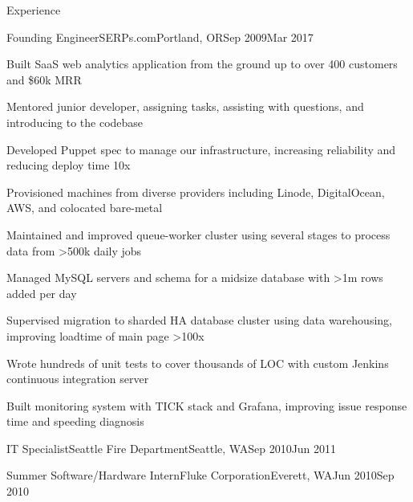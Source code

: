 \documentclass[letterpaper,12pt]{article}
\begin{document}
\begin{paracol}{2}
\begin{rsection}{Experience}
\begin{rexperienceitem}{Founding Engineer}{SERPs.com}{Portland, OR}{Sep 2009}{Mar 2017}
  \item Built SaaS web analytics application from the ground up to over 400 customers and \$60k MRR
  \item Mentored junior developer, assigning tasks, assisting with questions, and introducing to the codebase
  \item Developed Puppet spec to manage our infrastructure, increasing reliability and reducing deploy time 10x
  \item Provisioned machines from diverse providers including Linode, DigitalOcean, AWS, and colocated bare-metal
  \item Maintained and improved queue-worker cluster using several stages to process data from \textgreater500k daily jobs
  \item Managed MySQL servers and schema for a midsize database with \textgreater1m rows added per day
  \item Supervised migration to sharded HA database cluster using data warehousing,
        improving loadtime of main page \textgreater100x
  \item Wrote hundreds of unit tests to cover thousands of LOC with custom Jenkins continuous integration server
  \item Built monitoring system with TICK stack and Grafana, improving issue response time and speeding diagnosis
\end{rexperienceitem}
\begin{rexperience}{IT Specialist}{Seattle Fire Department}{Seattle, WA}{Sep 2010}{Jun 2011}
\end{rexperience}
\begin{rexperience}{Summer Software/Hardware Intern}{Fluke Corporation}{Everett, WA}{Jun 2010}{Sep 2010}
\end{rexperience}
\end{rsection}


\end{paracol}
\end{document}
